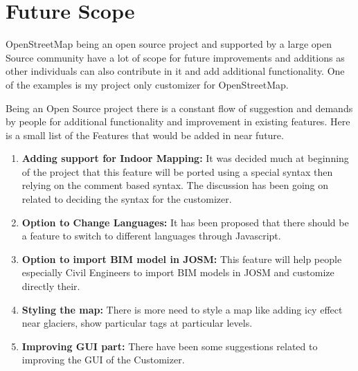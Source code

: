 
\section{Future Scope}
OpenStreetMap being an open source project and supported by a large open Source community have a lot of scope for future improvements and additions as other individuals can also contribute in it and add additional functionality. One of the examples is my project only customizer for OpenStreetMap.

Being an Open Source project there is a constant flow of suggestion and demands by people for additional functionality and improvement in existing features.
Here is a small list of the Features that would be added in near future.

\begin{enumerate}

\item \textbf{Adding support for Indoor Mapping:} It was decided much at beginning of the project that this feature will be ported using a special syntax then relying on the comment based syntax. The discussion has been going on related to deciding the syntax for the customizer.

\item \textbf{Option to Change Languages:} It has been proposed that there should be a feature to switch to different languages through Javascript.

\item \textbf{Option to import BIM model in JOSM:} This feature will help people especially Civil Engineers to import BIM models in JOSM and customize directly their.

\item \textbf{Styling the map:} There is more need to style a map like adding icy effect near glaciers, show particular tags at particular levels.

\item \textbf{Improving GUI part:} There have been some suggestions related to improving the GUI of the Customizer.
\end{enumerate}

